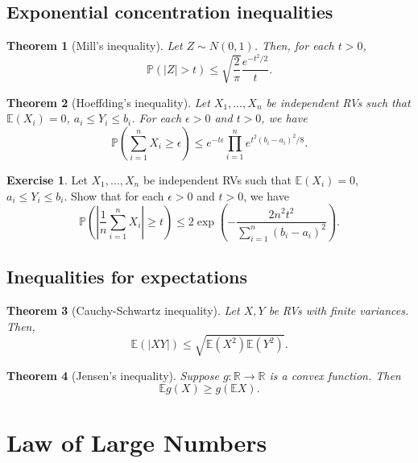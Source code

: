 \documentclass[
  openany]{book}
\newtheorem{theorem}{Theorem}[chapter]
\theoremstyle{definition}
\theoremstyle{definition}
\theoremstyle{definition}
\newtheorem{exercise}{Exercise}[chapter]
\theoremstyle{definition}
\theoremstyle{remark}
\begin{document}
\hypertarget{exponential-concentration-inequalities}{%
\subsection{Exponential concentration inequalities}\label{exponential-concentration-inequalities}}

\begin{theorem}[Mill's inequality]
Let \(Z \sim N(0,1)\). Then,
for each \(t >0\),
\[ \mathbb{P}(|Z| > t) \leq \sqrt{\frac{2}{\pi}} \frac{e^{-t^2/2}}{t}. \]
\end{theorem}

\begin{theorem}[Hoeffding's inequality]
Let \(X_1, \dots, X_n\) be independent RVs such that
\(\mathbb{E}( X_i ) = 0\), \(a_i \leq Y_i \leq b_i\).
For each \(\epsilon >0\) and \(t>0\), we have
\[ \mathbb{P}\left(  \sum_{i=1}^n X_i \geq \epsilon \right) 
\leq e^{-t\epsilon} \prod_{i=1}^n e^{t^2(b_i - a_i)^2/8}. \]
\end{theorem}

\begin{exercise}
\protect\hypertarget{exr:Hoeffding}{}\label{exr:Hoeffding}Let \(X_1, \dots, X_n\) be independent RVs such that
\(\mathbb{E}( X_i ) = 0\), \(a_i \leq Y_i \leq b_i\).
Show that
for each \(\epsilon >0\) and \(t>0\), we have
\[ \mathbb{P}\left( \left| \frac{1}{n}\sum_{i=1}^n X_i \right| \geq t \right) 
\leq 2  \exp\left( - \frac{2 n^2 t^2}{\sum_{i=1}^n (b_i - a_i)^2}   \right). \]
\end{exercise}

\hypertarget{inequalities-for-expectations}{%
\subsection{Inequalities for expectations}\label{inequalities-for-expectations}}

\begin{theorem}[Cauchy-Schwartz inequality]
Let \(X, Y\) be RVs with finite variances. Then,
\[\mathbb{E}( |XY| ) \leq \sqrt{ \mathbb{E}(X^2) \mathbb{E}(Y^2) }.\]
\end{theorem}

\begin{theorem}[Jensen's inequality]
Suppose \(g:\mathbb{R}\to \mathbb{R}\) is a convex function.
Then
\[ \mathbb{E}g(X) \geq g(\mathbb{E}X). \]
\end{theorem}

\hypertarget{law-of-large-numbers}{%
\section{Law of Large Numbers}\label{law-of-large-numbers}}
\end{document}
